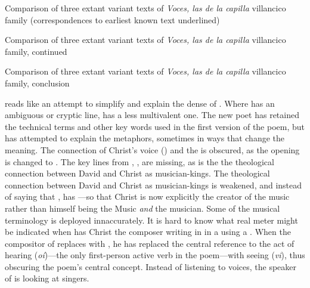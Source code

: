 {Comparison of three extant variant texts of \emph{Voces, las de la capilla}
villancico family (correspondences to earliest known text underlined)}

{Comparison of three extant variant texts of \emph{Voces, las de la capilla}
villancico family, continued}

{Comparison of three extant variant texts of \emph{Voces, las de la capilla}
villancico family, conclusion}

 reads like an attempt to simplify and explain the dense
 of .
Where  has an ambiguous or cryptic line,  has a
less multivalent one. 
The new poet has retained the technical terms and other key words used in the
first version of the poem, but has attempted to explain the metaphors, sometimes
in ways that change the meaning.
The connection of Christ's voice () and the  is obscured, as the opening is changed to .
The key lines from , , are missing, as is the the theological connection between
David and Christ as musician-kings.
The theological connection between David and Christ as musician-kings is
weakened, and instead of saying that ,
 has ---so that Christ is now
explicitly the creator of the music rather than himself being the Music
\emph{and} the musician.
Some of the musical terminology is deployed innaccurately. 
It is hard to know what real meter might be indicated when 
has Christ the composer writing in  in a
 using a .
When the compositor of  replaces  with , he has replaced the central
reference to the act of hearing (\emph{oí})---the only first-person active verb
in the poem---with seeing (\emph{vi}), thus obscuring the poem's central
concept. 
Instead of listening to voices, the speaker of  is looking at
singers.

